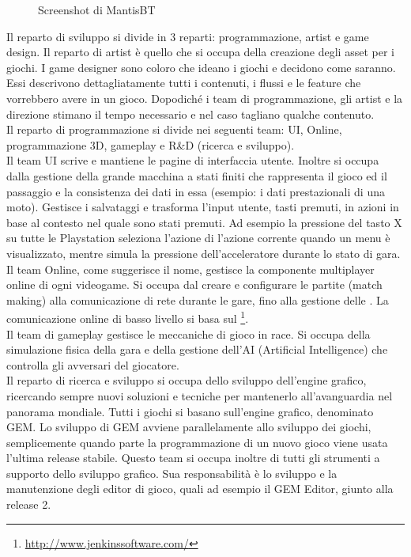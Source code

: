 \begin{figure}
	\centering
	\caption{Screenshot di MantisBT}
	\label{fig:screenshot-mantis}
\end{figure}

Il reparto di sviluppo si divide in 3 reparti: programmazione, artist e game design. Il reparto di artist è quello che si occupa della creazione degli asset per i giochi. I game designer sono coloro che ideano i giochi e decidono come saranno. Essi descrivono dettagliatamente tutti i contenuti, i flussi e le feature che vorrebbero avere in un gioco. Dopodiché i team di programmazione, gli artist e la direzione stimano il tempo necessario e nel caso tagliano qualche contenuto.\\

Il reparto di programmazione si divide nei seguenti team: UI, Online, programmazione 3D, gameplay e R\&D (ricerca e sviluppo).\\

Il team UI scrive e mantiene le pagine di interfaccia utente. Inoltre si occupa dalla gestione della grande macchina a stati finiti che rappresenta il gioco ed il passaggio e la consistenza dei dati in essa (esempio: i dati prestazionali di una moto). Gestisce i salvataggi e trasforma l'input utente, tasti premuti, in azioni in base al contesto nel quale sono stati premuti. Ad esempio la pressione del tasto X su tutte le Playstation\textsuperscript{\textregistered} seleziona l'azione di l'azione corrente quando un menu è visualizzato, mentre simula la pressione dell'acceleratore durante lo stato di gara.\\

Il team Online, come suggerisce il nome, gestisce la componente multiplayer online di ogni videogame. Si occupa dal creare e configurare le partite (match making) alla comunicazione di rete durante le gare, fino alla gestione delle . La comunicazione online di basso livello si basa sul  \footnote{\url{http://www.jenkinssoftware.com/}}.\\

Il team di gameplay gestisce le meccaniche di gioco in race. Si occupa della simulazione fisica della gara e della gestione dell'AI (Artificial Intelligence) che controlla gli avversari del giocatore.\\

Il reparto di ricerca e sviluppo si occupa dello sviluppo dell'engine grafico, ricercando sempre nuovi soluzioni e tecniche per mantenerlo all'avanguardia nel panorama mondiale. Tutti i giochi si basano sull'engine grafico, denominato GEM. Lo sviluppo di GEM avviene parallelamente allo sviluppo dei giochi, semplicemente quando parte la programmazione di un nuovo gioco viene usata l'ultima release stabile. Questo team si occupa inoltre di tutti gli strumenti a supporto dello sviluppo grafico. Sua responsabilità è lo sviluppo e la manutenzione degli editor di gioco, quali ad esempio il GEM Editor, giunto alla release 2.\\

